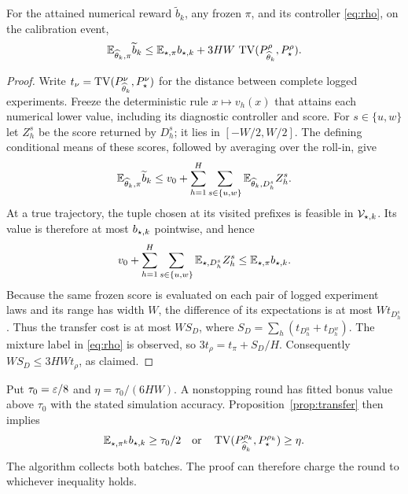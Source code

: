 \begin{proposition}\label{prop:transfer}
For the attained numerical reward $\widetilde b_k$, any frozen $\pi$, and its controller \eqref{eq:rho}, on the calibration event,
\begin{equation}
 \mathbb E_{\widehat\theta_k,\pi}\widetilde b_k
 \le \mathbb E_{\star,\pi} b_{\star,k}
       +3HW\,\operatorname{TV}(P_{\widehat\theta_k}^\rho,P_\star^\rho).
 \label{eq:transfer}
\end{equation}
\end{proposition}
\begin{proof}
Write $t_\nu=\operatorname{TV}(P_{\widehat\theta_k}^\nu,P_\star^\nu)$ for the distance between complete logged experiments. Freeze the deterministic rule $x\mapsto v_h(x)$ that attains each numerical lower value, including its diagnostic controller and score. For $s\in\{u,w\}$ let $Z_h^s$ be the score returned by $D_h^s$; it lies in $[-W/2,W/2]$. The defining conditional means of these scores, followed by averaging over the roll-in, give
\[
 \mathbb E_{\widehat\theta_k,\pi}\widetilde b_k
 \le v_0+\sum_{h=1}^H\sum_{s\in\{u,w\}}
      \mathbb E_{\widehat\theta_k,D_h^s} Z_h^s.
\]
At a true trajectory, the tuple chosen at its visited prefixes is feasible in $\mathcal V_{\star,k}$. Its value is therefore at most $b_{\star,k}$ pointwise, and hence
\[
 v_0+\sum_{h=1}^H\sum_{s\in\{u,w\}}
      \mathbb E_{\star,D_h^s} Z_h^s
 \le \mathbb E_{\star,\pi}b_{\star,k}.
\]
Because the same frozen score is evaluated on each pair of logged experiment laws and its range has width $W$, the difference of its expectations is at most $Wt_{D_h^s}$. Thus the transfer cost is at most $WS_D$, where $S_D=\sum_h(t_{D_h^u}+t_{D_h^w})$. The mixture label in \eqref{eq:rho} is observed, so $3t_\rho=t_\pi+S_D/H$. Consequently $WS_D\le3HWt_\rho$, as claimed.
\end{proof}

Put $\tau_0=\varepsilon/8$ and $\eta=\tau_0/(6HW)$. A nonstopping round has fitted bonus value above $\tau_0$ with the stated simulation accuracy. Proposition~\ref{prop:transfer} then implies
\begin{equation}
 \mathbb E_{\star,\pi^k}b_{\star,k}\ge\tau_0/2
 \quad\text{or}\quad
 \operatorname{TV}(P_{\widehat\theta_k}^{\rho_k},P_\star^{\rho_k})\ge\eta.
 \label{eq:either}
\end{equation}
The algorithm collects both batches. The proof can therefore charge the round to whichever inequality holds.
